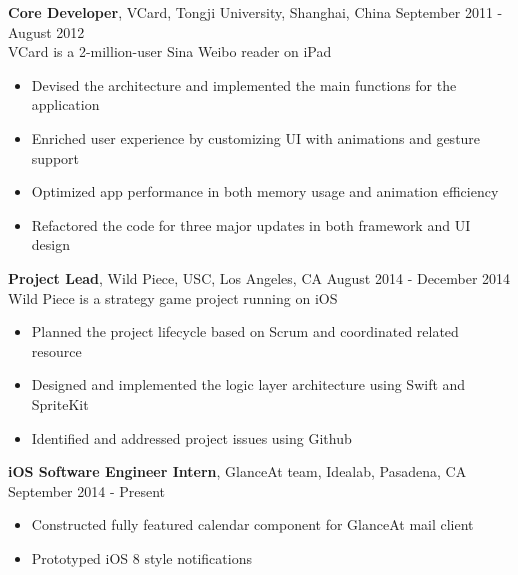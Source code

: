 \documentclass[line, overlapped]{res}
\begin{document}
\begin{resume}
\begin{itemize}
 \end{itemize}

\textbf{Core Developer}, VCard, Tongji University, Shanghai, China \hfill September 2011 - August 2012\\
 VCard is a 2-million-user Sina Weibo reader on iPad
 \begin{itemize} \itemsep -2pt  %

  \item Devised the architecture and implemented the main functions for the application

  \item Enriched user experience by customizing UI with animations and gesture support

  \item Optimized app performance in both memory usage and animation efficiency

  \item Refactored the code for three major updates in both framework and UI design

 \end{itemize}
 
\textbf{Project Lead}, Wild Piece, USC, Los Angeles, CA \hfill August 2014 - December 2014\\
Wild Piece is a strategy game project running on iOS
\begin{itemize} \itemsep -2pt %
  \item Planned the project lifecycle based on Scrum and coordinated related resource
  
  \item Designed and implemented the logic layer architecture using Swift and SpriteKit
  
  \item Identified and addressed project issues using Github

\end{itemize}
 
 \textbf{iOS Software Engineer Intern}, GlanceAt team, Idealab, Pasadena, CA \hfill September 2014 - Present
 \begin{itemize} \itemsep -2pt
 
 \item Constructed fully featured calendar component for GlanceAt mail client
 
 \item Prototyped iOS 8 style notifications
  
 \end{itemize}


\end{resume}
\end{document}

